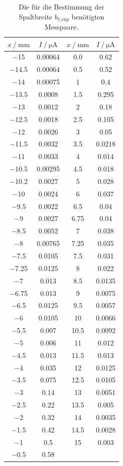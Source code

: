 \begin{table}
\centering
\caption{Die für die Bestimmung der Spaltbreite $b_\text{1,exp}$ benötigten Messpaare.}
\label{tab:einzel1}
\begin{tabular}{c c c c}
\toprule
$x\:/\: \si{\milli\meter}$ & $I\:/\: \si{\micro\ampere}$ &
$x\:/\: \si{\milli\meter}$ & $I\:/\: \si{\micro\ampere}$ \\
\midrule
\num{-15  } & 0.00064  & 0.0     & 0.62  \\
\num{-14.5} & 0.00064  & 0.5     & 0.52  \\
\num{-14  } & 0.00075  & 1       & 0.4  \\
\num{-13.5} & 0.0008   & 1.5     & 0.295  \\
\num{-13  } & 0.0012   & 2       & 0.18  \\
\num{-12.5} & 0.0018   & 2.5     & 0.105  \\
\num{-12  } & 0.0026   & 3       & 0.05  \\
\num{-11.5} & 0.0032   & 3.5     & 0.0218  \\
\num{-11  } & 0.0033   & 4       & 0.014  \\
\num{-10.5} & 0.00295  & 4.5     & 0.018  \\
\num{-10.2} & 0.0027   & 5       & 0.028  \\
\num{-10  } & 0.0024   & 6       & 0.037  \\
\num{-9.5}  & 0.0022   & 6.5     & 0.04  \\
\num{-9   } & 0.0027   & 6.75    & 0.04  \\
\num{-8.5}  & 0.0052   & 7       & 0.038  \\
\num{-8   } & 0.00765  & 7.25    & 0.035  \\
\num{-7.5}  & 0.0105   & 7.5     & 0.031  \\
\num{-7.25} & 0.0125   & 8       & 0.022  \\
\num{-7   } & 0.013    & 8.5     & 0.0135  \\
\num{-6.75} & 0.013    & 9       & 0.0075  \\
\num{-6.5}  & 0.0125   & 9.5     & 0.0057  \\
\num{-6   } & 0.0105   & 10      & 0.0066  \\
\num{-5.5}  & 0.007    & 10.5    & 0.0092  \\
\num{-5   } & 0.006    & 11      & 0.012  \\
\num{-4.5}  & 0.013    & 11.5    & 0.013  \\
\num{-4   } & 0.035    & 12      & 0.0125  \\
\num{-3.5}  & 0.075    & 12.5    & 0.0105  \\	
\num{-3	  } & 0.14     & 13      & 0.0051  \\
\num{-2.5}  & 0.22     & 13.5    & 0.005  \\	
\num{-2	  } & 0.32     & 14      & 0.0035  \\
\num{-1.5}  & 0.42     & 14.5    & 0.0028  \\	
\num{-1	  } & 0.5      & 15      & 0.003  \\
\num{-0.5}  & 0.58     & 	& \\
\bottomrule
\end{tabular}
\end{table}

